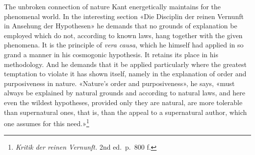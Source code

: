 \documentclass[12pt,a4paper]{article}
\newcommand{\opage}[1]{\marginnote{\footnotesize\textit{[#1]}}}
\begin{document}
\opage{17}The unbroken connection of nature Kant energetically maintains for the
phenomenal world. In the interesting section «Die Disciplin der reinen
Vernunft in Ansehung der Hypothesen» he demands that no grounds of
explanation be employed which do not, according to known laws, hang
together with the given phenomena. It is the principle of \textit{vera
causa}, which he himself had applied in so grand a manner in his cosmogonic
hypothesis. It retains its place in his methodology. And he demands that
it be applied particularly where the greatest temptation to violate it has
shown itself, namely in the explanation of order and purposiveness in
nature. «Nature's order and purposiveness», he says, «must always be
explained by natural grounds and according to natural laws, and here even
the wildest hypotheses, provided only they are natural, are more tolerable
than supernatural ones, that is, than the appeal to a supernatural author,
which one assumes for this need.»\footnote{\textit{Kritik der reinen
Vernunft.} 2nd ed.\ p.\ 800 f.}
\end{document}
